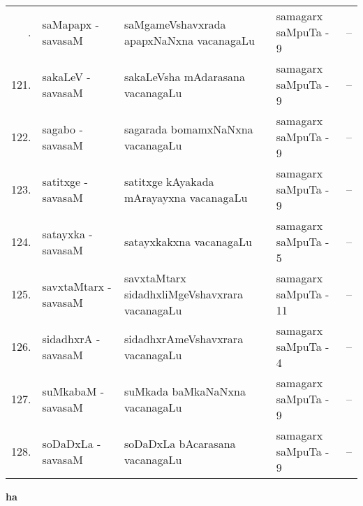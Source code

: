 {\renewcommand{\arraystretch}{1.3}
\begin{longtable}{rl>{\raggedright}p{5.5cm}lc}
\hline
\endfirsthead
\hline
\endhead
\hline
\endfoot
\endlastfoot
120. & saMapapx - savasaM &  saMgameVshavxrada apapxNaNxna vacanagaLu & samagarx saMpuTa - 9 & --\\
121. & sakaLeV - savasaM & sakaLeVsha mAdarasana vacanagaLu & samagarx saMpuTa - 9 & --\\
122. & sagabo - savasaM & sagarada bomamxNaNxna vacanagaLu & samagarx saMpuTa - 9 & --\\
123. & satitxge - savasaM & satitxge kAyakada mArayayxna vacanagaLu & samagarx saMpuTa - 9 & --\\
124. & satayxka - savasaM & satayxkakxna vacanagaLu & samagarx saMpuTa - 5 & --\\
125. & savxtaMtarx - savasaM &  savxtaMtarx sidadhxliMgeVshavxrara vacanagaLu & samagarx saMpuTa - 11 & --\\
126. & sidadhxrA - savasaM & sidadhxrAmeVshavxrara vacanagaLu & samagarx saMpuTa - 4 & --\\
127. & suMkabaM - savasaM & suMkada baMkaNaNxna vacanagaLu & samagarx saMpuTa - 9 & --\\
128. & soDaDxLa - savasaM &  soDaDxLa bAcarasana vacanagaLu & samagarx saMpuTa - 9 & --
\end{longtable}}
\medskip

\centerline{\bf ha}

